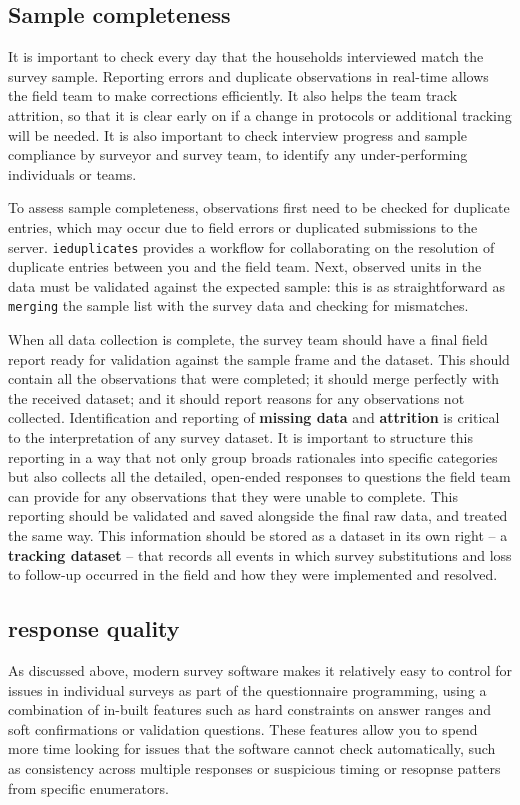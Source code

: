 \subsection{Sample completeness}
It is important to check every day that the households interviewed match the survey sample. Reporting errors and duplicate observations in real-time allows the field team to make corrections efficiently.
It also helps the team track attrition, so that it is clear early on if a change in protocols or additional tracking will be needed. It is also important to check interview progress and sample compliance by surveyor and survey team, to identify any under-performing individuals or teams. 

To assess sample completeness, observations first need to be checked for duplicate entries, which may occur due to field errors or duplicated submissions to the server. 
\texttt{ieduplicates}
provides a workflow for collaborating on the resolution of duplicate entries between you and the field team.
Next, observed units in the data must be validated against the expected sample:
this is as straightforward as \texttt{merging} the sample list with the survey data and checking for mismatches.

When all data collection is complete,
the survey team should have a final field report
ready for validation against the sample frame and the dataset.
This should contain all the observations that were completed;
it should merge perfectly with the received dataset;
and it should report reasons for any observations not collected.
Identification and reporting of \textbf{missing data} and \textbf{attrition} is critical
to the interpretation of any survey dataset.
It is important to structure this reporting in a way that
not only group broads rationales into specific categories
but also collects all the detailed, open-ended responses to questions the field team can provide
for any observations that they were unable to complete.
This reporting should be validated and saved
alongside the final raw data, and treated the same way.
This information should be stored as a dataset in its own right
-- a \textbf{tracking dataset} --
that records all events in which survey substitutions
and loss to follow-up occurred in the field
and how they were implemented and resolved.


\subsection{response quality}
As discussed above, modern survey software makes it relatively easy to control for issues in individual surveys as part of the questionnaire programming, using a combination of in-built features such as hard constraints on answer ranges and soft confirmations or validation questions. These features allow you to spend more time looking for issues that the software cannot check automatically, such as consistency across multiple responses or suspicious timing or resopnse patters from specific enumerators. 


